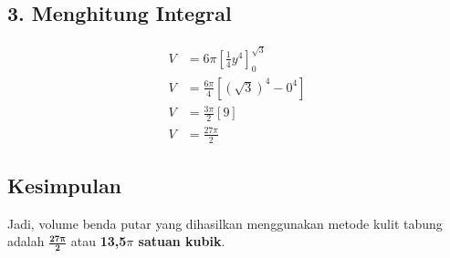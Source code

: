 \subsection*{3. Menghitung Integral}
\begin{align*}
V &= 6\pi \left[ \frac{1}{4} y^4 \right]_{0}^{\sqrt{3}} \\
V &= \frac{6\pi}{4} \left[ (\sqrt{3})^4 - 0^4 \right] \\
V &= \frac{3\pi}{2} [ 9 ] \\
V &= \frac{27\pi}{2}
\end{align*}

\subsection*{Kesimpulan}
Jadi, volume benda putar yang dihasilkan menggunakan metode kulit tabung adalah $\mathbf{\frac{27\pi}{2}}$ atau \textbf{13,5$\pi$ satuan kubik}.


